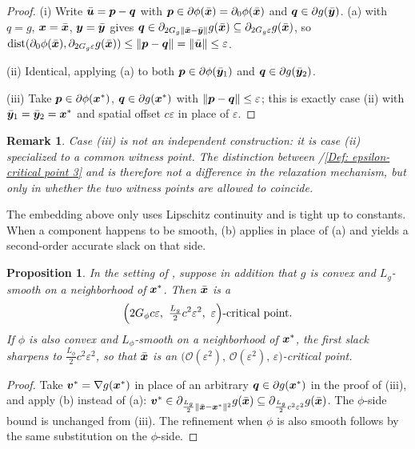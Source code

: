 \documentclass[english]{article}
\newtheorem{proposition}{Proposition}[section]
\newtheorem{remark}{Remark}[section]
\begin{document}
\begin{proof}
(i) Write $\bar{\bm{u}}=\bm{p}-\bm{q}$ with $\bm{p}\in\partial\phi(\bar{\bm{x}})
=\partial_0\phi(\bar{\bm{x}})$ and $\bm{q}\in\partial g(\bar{\bm{y}})$.
(a) with $q=g$, $\bm{x}=\bar{\bm{x}}$, $\bm{y}=\bar{\bm{y}}$
gives $\bm{q}\in\partial_{2G_g\|\bar{\bm{x}}-\bar{\bm{y}}\|}g(\bar{\bm{x}})\subseteq
\partial_{2G_g\varepsilon}g(\bar{\bm{x}})$, so
$\operatorname{dist}(\partial_0\phi(\bar{\bm{x}}),\partial_{2G_g\varepsilon}g(\bar{\bm{x}}))
\le\|\bm{p}-\bm{q}\|=\|\bar{\bm{u}}\|\le\varepsilon$.

(ii) Identical, applying (a) to both
$\bm{p}\in\partial\phi(\bar{\bm{y}}_1)$ and $\bm{q}\in\partial g(\bar{\bm{y}}_2)$.

(iii) Take $\bm{p}\in\partial\phi(\bm{x}^*)$, $\bm{q}\in\partial g(\bm{x}^*)$ with
$\|\bm{p}-\bm{q}\|\le\varepsilon$; this is exactly case (ii) with
$\bar{\bm{y}}_1=\bar{\bm{y}}_2=\bm{x}^*$ and spatial offset $c\varepsilon$ in place of
$\varepsilon$.
\end{proof}

\begin{remark}
Case (iii) is not an independent construction: it is case (ii)
specialized to a common witness point. The distinction between
/\ref{Def: epsilon-critical point 3}
and  is therefore not a difference in the
relaxation mechanism, but only in whether the two witness points are
allowed to coincide.
\end{remark}

The embedding above only uses Lipschitz continuity and is tight up to
constants. When a component happens to be smooth,
(b) applies in place of (a) and yields a
second-order accurate slack on that side.

\begin{proposition}
\label{prop:sharp-smooth}
In the setting of , suppose in addition that
$g$ is convex and $L_g$-smooth on a neighborhood of $\bm{x}^*$. Then
$\bar{\bm{x}}$ is a
\[
    \Bigl(2G_\phi c\varepsilon,\ \tfrac{L_g}{2}c^2\varepsilon^2,\
    \varepsilon\Bigr)\text{-critical point}.
\]
If $\phi$ is also convex and $L_\phi$-smooth on a neighborhood of
$\bm{x}^*$, the first slack sharpens to $\tfrac{L_\phi}{2}c^2\varepsilon^2$,
so that $\bar{\bm{x}}$ is an
$\bigl(\mathcal O(\varepsilon^2),\,\mathcal O(\varepsilon^2),\,
\varepsilon\bigr)$-critical point.
\end{proposition}

\begin{proof}
Take $\bm{v}^*=\nabla g(\bm{x}^*)$ in place of an arbitrary
$\bm{q}\in\partial g(\bm{x}^*)$ in the proof of
(iii), and apply
(b) instead of (a):
$\bm{v}^*\in\partial_{\frac{L_g}{2}\|\bar{\bm{x}}-\bm{x}^*\|^2}g(\bar{\bm{x}})
\subseteq\partial_{\frac{L_g}{2}c^2\varepsilon^2}g(\bar{\bm{x}})$. The
$\phi$-side bound is unchanged from
(iii). The refinement when
$\phi$ is also smooth follows by the same substitution on the
$\phi$-side.
\end{proof}
\end{document}
